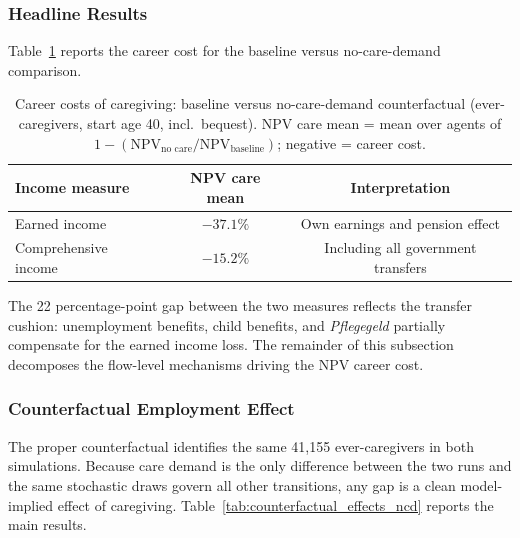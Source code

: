 \subsubsection{Headline Results}

Table~\ref{tab:career_costs_baseline_ncd} reports the career cost for the baseline versus no-care-demand comparison.

\begin{table}[htbp]
  \centering
  \caption{Career costs of caregiving: baseline versus no-care-demand counterfactual (ever-caregivers, start age 40, incl.\ bequest). NPV care mean = mean over agents of $1 - (\text{NPV}_{\text{no care}} / \text{NPV}_{\text{baseline}})$; negative = career cost.}
  \label{tab:career_costs_baseline_ncd}
  \begin{tabular}{lcc}
    \toprule
    Income measure & NPV care mean & Interpretation \\
    \midrule
    Earned income & $-37.1\%$ & Own earnings and pension effect \\
    Comprehensive income & $-15.2\%$ & Including all government transfers \\
    \bottomrule
  \end{tabular}
\end{table}

The 22 percentage-point gap between the two measures reflects the transfer cushion: unemployment benefits, child benefits, and \textit{Pflegegeld} partially compensate for the earned income loss. The remainder of this subsection decomposes the flow-level mechanisms driving the NPV career cost.

\subsubsection{Counterfactual Employment Effect}

The proper counterfactual identifies the same 41,155 ever-caregivers in both simulations. Because care demand is the only difference between the two runs and the same stochastic draws govern all other transitions, any gap is a clean model-implied effect of caregiving. Table~\ref{tab:counterfactual_effects_ncd} reports the main results.

